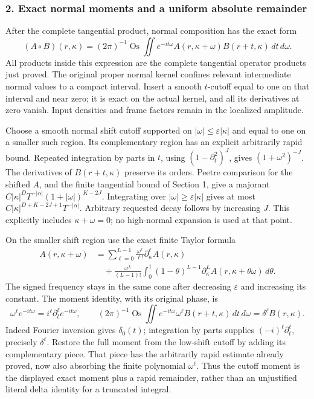 \documentclass[
  11pt,
]{article}
\begin{document}
\subsubsection{2. Exact normal moments and a uniform absolute
remainder}\label{exact-normal-moments-and-a-uniform-absolute-remainder}

After the complete tangential product, normal composition has the exact
form \[
 (A\circ B)(r,\kappa)
 =(2\pi)^{-1}\operatorname{Os}\iint
 e^{-it\omega}A(r,\kappa+\omega)B(r+t,\kappa)\,dt\,d\omega.
 \tag{NC3}
\] All products inside this expression are the complete tangential
operator products just proved. The original proper normal kernel
confines relevant intermediate normal values to a compact interval.
Insert a smooth \(t\)-cutoff equal to one on that interval and near
zero; it is exact on the actual kernel, and all its derivatives at zero
vanish. Input densities and frame factors remain in the localized
amplitude.

Choose a smooth normal shift cutoff supported on
\(|\omega|\leq\varepsilon|\kappa|\) and equal to one on a smaller such
region. Its complementary region has an explicit arbitrarily rapid
bound. Repeated integration by parts in \(t\), using
\((1-\partial_t^2)^J\), gives \((1+\omega^2)^{-J}\). The derivatives of
\(B(r+t,\kappa)\) preserve its orders. Peetre comparison for the shifted
\(A\), and the finite tangential bound of Section 1, give a majorant
\(C|\kappa|^D T^{-|\alpha|}(1+|\omega|)^{K-2J}\). Integrating over
\(|\omega|\geq\varepsilon|\kappa|\) gives at most
\(C|\kappa|^{D+K-2J+1}T^{-|\alpha|}\). Arbitrary requested decay follows
by increasing \(J\). This explicitly includes \(\kappa+\omega=0\); no
high-normal expansion is used at that point.

On the smaller shift region use the exact finite Taylor formula \[
 \begin{split}
 A(r,\kappa+\omega)
 &=\sum_{\ell=0}^{L-1}\frac{\omega^\ell}{\ell!}
       \partial_\kappa^\ell A(r,\kappa)\\
 &\quad+\frac{\omega^L}{(L-1)!}
       \int_0^1(1-\theta)^{L-1}
              \partial_\kappa^L A(r,\kappa+\theta\omega)\,d\theta.
 \end{split}
 \tag{NC4}
\] The signed frequency stays in the same cone after decreasing
\(\varepsilon\) and increasing its constant. The moment identity, with
its original phase, is \[
 \omega^\ell e^{-it\omega}=i^\ell\partial_t^\ell e^{-it\omega},
 \qquad
 (2\pi)^{-1}\operatorname{Os}\iint
 e^{-it\omega}\omega^\ell B(r+t,\kappa)\,dt\,d\omega
   =\delta^\ell B(r,\kappa).
 \tag{NC5}
\] Indeed Fourier inversion gives \(\delta_0(t)\); integration by parts
supplies \((-i)^\ell\partial_t^\ell\), precisely \(\delta^\ell\).
Restore the full moment from the low-shift cutoff by adding its
complementary piece. That piece has the arbitrarily rapid estimate
already proved, now also absorbing the finite polynomial
\(\omega^\ell\). Thus the cutoff moment is the displayed exact moment
plus a rapid remainder, rather than an unjustified literal delta
identity for a truncated integral.
\end{document}
